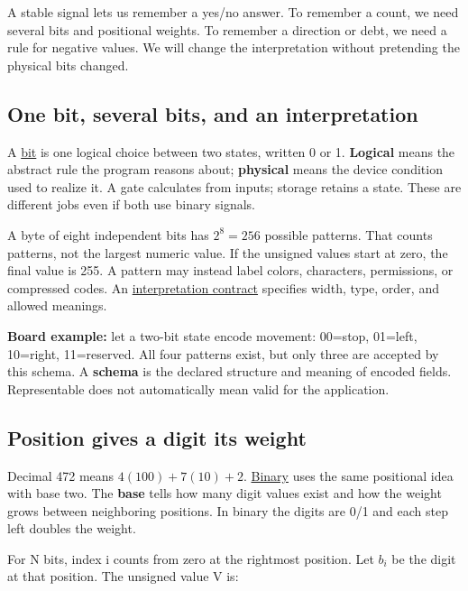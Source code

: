 A stable signal lets us remember a yes/no answer. To remember a count, we need several bits and positional weights. To remember a direction or debt, we need a rule for negative values. We will change the interpretation without pretending the physical bits changed.

\subsection{One bit, several bits, and an interpretation}\label{01-foundations-i-ch001-one-bit-several-bits-and-an-interpretation}

A \hyperref[appendix-ddbb69998a2e]{bit} is one logical choice between two states, written 0 or 1. \textbf{Logical} means the abstract rule the program reasons about; \textbf{physical} means the device condition used to realize it. A gate calculates from inputs; storage retains a state. These are different jobs even if both use binary signals.

A byte of eight independent bits has \(2^8=256\) possible patterns. That counts patterns, not the largest numeric value. If the unsigned values start at zero, the final value is 255. A pattern may instead label colors, characters, permissions, or compressed codes. An \hyperref[appendix-f414bd4ed05c]{interpretation contract} specifies width, type, order, and allowed meanings.

\textbf{Board example:} let a two-bit state encode movement: 00=stop, 01=left, 10=right, 11=reserved. All four patterns exist, but only three are accepted by this schema. A \textbf{schema} is the declared structure and meaning of encoded fields. Representable does not automatically mean valid for the application.

\subsection{Position gives a digit its weight}\label{01-foundations-i-ch001-position-gives-a-digit-its-weight}

Decimal 472 means \(4(100)+7(10)+2\). \hyperref[appendix-83c3f28f7bda]{Binary} uses the same positional idea with base two. The \textbf{base} tells how many digit values exist and how the weight grows between neighboring positions. In binary the digits are 0/1 and each step left doubles the weight.

For N bits, index i counts from zero at the rightmost position. Let \(b_i\) be the digit at that position. The unsigned value V is:

